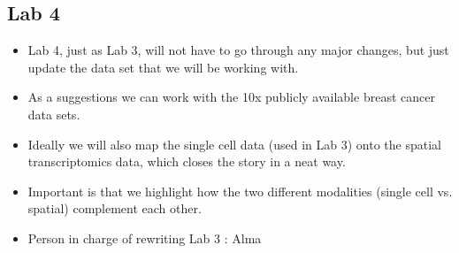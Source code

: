 \documentclass[11pt]{article}
\begin{document}
\subsection{Lab 4}
\label{sec:org86979e5}
\begin{itemize}
\item Lab 4, just as Lab 3, will not have to go through any major changes, but
just update the data set that we will be working with.
\item As a suggestions we can work with the 10x publicly available breast cancer
data sets.
\item Ideally we will also map the single cell data (used in Lab 3) onto the
spatial transcriptomics data, which closes the story in a neat way.
\item Important is that we highlight how the two different modalities (single
cell vs. spatial) complement each other.

\item Person in charge of rewriting Lab 3 : Alma
\end{itemize}
\end{document}
